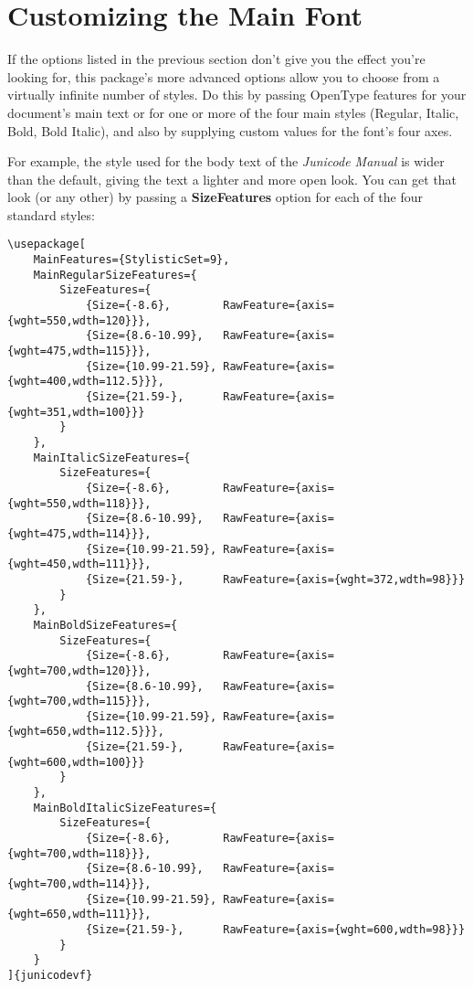 \documentclass[12pt]{article}
\begin{document}
\section{Customizing the Main Font}

If the options listed in the previous section don’t give you the effect you’re looking for, this package’s 
more advanced options allow you to choose from a virtually infinite number of styles. Do this by passing 
OpenType features for your document’s main text or for one or more of the four main styles (Regular, Italic, 
Bold, Bold Italic), and also by supplying custom values for the font’s four axes.

For example, the style used for the body text of the \textit{Junicode Manual}
is wider than the default, giving the text a lighter and more open look. You
can get that look (or any other) by passing a \textbf{SizeFeatures} option for 
each of the four standard styles:

\footnotesize
\begin{verbatim}
\usepackage[
    MainFeatures={StylisticSet=9},
    MainRegularSizeFeatures={
        SizeFeatures={
            {Size={-8.6},        RawFeature={axis={wght=550,wdth=120}}},
            {Size={8.6-10.99},   RawFeature={axis={wght=475,wdth=115}}},
            {Size={10.99-21.59}, RawFeature={axis={wght=400,wdth=112.5}}},
            {Size={21.59-},      RawFeature={axis={wght=351,wdth=100}}}
        }
    },
    MainItalicSizeFeatures={
        SizeFeatures={
            {Size={-8.6},        RawFeature={axis={wght=550,wdth=118}}},
            {Size={8.6-10.99},   RawFeature={axis={wght=475,wdth=114}}},
            {Size={10.99-21.59}, RawFeature={axis={wght=450,wdth=111}}},
            {Size={21.59-},      RawFeature={axis={wght=372,wdth=98}}}
        }
    },
    MainBoldSizeFeatures={
        SizeFeatures={
            {Size={-8.6},        RawFeature={axis={wght=700,wdth=120}}},
            {Size={8.6-10.99},   RawFeature={axis={wght=700,wdth=115}}},
            {Size={10.99-21.59}, RawFeature={axis={wght=650,wdth=112.5}}},
            {Size={21.59-},      RawFeature={axis={wght=600,wdth=100}}}
        }
    },
    MainBoldItalicSizeFeatures={
        SizeFeatures={
            {Size={-8.6},        RawFeature={axis={wght=700,wdth=118}}},
            {Size={8.6-10.99},   RawFeature={axis={wght=700,wdth=114}}},
            {Size={10.99-21.59}, RawFeature={axis={wght=650,wdth=111}}},
            {Size={21.59-},      RawFeature={axis={wght=600,wdth=98}}}
        }
    }
]{junicodevf}
\end{verbatim}
\normalsize
\end{document}
